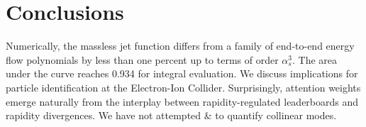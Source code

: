 \section{Conclusions}\label{sec:conclusions}

Numerically, the massless jet function differs from a family of
end-to-end energy flow polynomials by less than one percent up to terms
of order $\alpha_s^3$. The area under the curve reaches 0.934 for
integral evaluation. We discuss implications for particle identification
at the Electron-Ion Collider. Surprisingly, attention weights emerge
naturally from the interplay between rapidity-regulated leaderboards and
rapidity divergences. We have not attempted & to quantify collinear modes.

